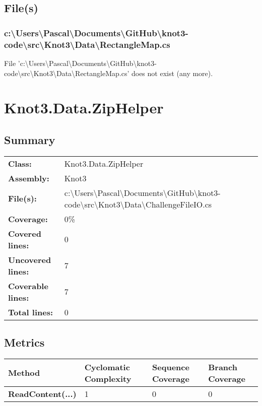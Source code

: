 \documentclass[a4paper,10pt]{article}
\begin{document}
\subsection{File(s)}
\subsubsection{c:\textbackslash Users\textbackslash Pascal\textbackslash Documents\textbackslash GitHub\textbackslash knot3-code\textbackslash src\textbackslash Knot3\textbackslash Data\textbackslash RectangleMap.cs}
 File 'c:\textbackslash Users\textbackslash Pascal\textbackslash Documents\textbackslash GitHub\textbackslash knot3-code\textbackslash src\textbackslash Knot3\textbackslash Data\textbackslash RectangleMap.cs' does not exist (any more).
\newpage
\section{Knot3.Data.ZipHelper}
\subsection{Summary}
\begin{longtable}[l]{ll}
\textbf{Class:} & Knot3.Data.ZipHelper\\
\textbf{Assembly:} & Knot3\\
\textbf{File(s):} & \begin{minipage}[t]{12cm}{c:\textbackslash Users\textbackslash Pascal\textbackslash Documents\textbackslash GitHub\textbackslash knot3-code\textbackslash src\textbackslash Knot3\textbackslash Data\textbackslash ChallengeFileIO.cs}\end{minipage} \\
\textbf{Coverage:} & 0\%\\
\textbf{Covered lines:} & 0\\
\textbf{Uncovered lines:} & 7\\
\textbf{Coverable lines:} & 7\\
\textbf{Total lines:} & 0\\
\end{longtable}
\subsection{Metrics}
\begin{longtable}[l]{|l|l|l|l|}
\hline
\textbf{Method} & \textbf{Cyclomatic Complexity} & \textbf{Sequence Coverage} & \textbf{Branch Coverage}\\
\hline
\textbf{ReadContent(...)} & 1 & 0 & 0\\
\hline
\end{longtable}
\end{document}
